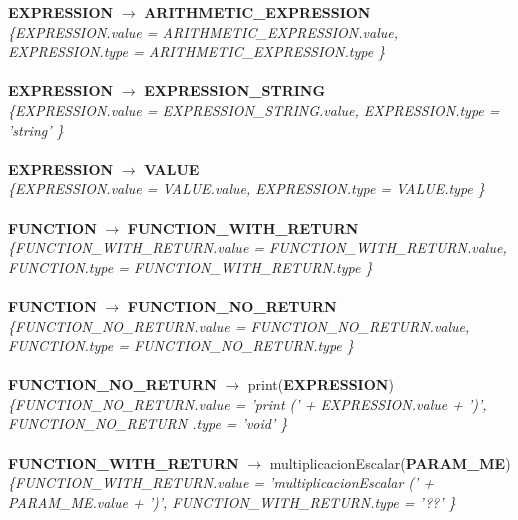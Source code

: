 \documentclass[10pt,a4paper]{article}
\begin{document}
\textbf{EXPRESSION} $\rightarrow$ \textbf{ARITHMETIC\_EXPRESSION} \\   

\textit{\{EXPRESSION.value =  ARITHMETIC\_EXPRESSION.value, EXPRESSION.type = ARITHMETIC\_EXPRESSION.type \}}  \\ \\


\textbf{EXPRESSION} $\rightarrow$ \textbf{EXPRESSION\_STRING} \\

\textit{\{EXPRESSION.value =  EXPRESSION\_STRING.value, EXPRESSION.type = 'string' \}}  \\ \\


\textbf{EXPRESSION} $\rightarrow$ \textbf{VALUE} \\

\textit{\{EXPRESSION.value =  VALUE.value, EXPRESSION.type = VALUE.type \}}  \\ \\



\textbf{FUNCTION} $\rightarrow$ \textbf{FUNCTION\_WITH\_RETURN} \\

\textit{\{FUNCTION\_WITH\_RETURN.value =  FUNCTION\_WITH\_RETURN.value, FUNCTION.type = FUNCTION\_WITH\_RETURN.type \}}  \\ \\


\textbf{FUNCTION} $\rightarrow$ \textbf{FUNCTION\_NO\_RETURN} \\

\textit{\{FUNCTION\_NO\_RETURN.value =  FUNCTION\_NO\_RETURN.value, FUNCTION.type = FUNCTION\_NO\_RETURN.type \}}  \\ \\



\textbf{FUNCTION\_NO\_RETURN} $\rightarrow$ print(\textbf{EXPRESSION}) \\   

\textit{\{FUNCTION\_NO\_RETURN.value =  'print (' + EXPRESSION.value + ')', FUNCTION\_NO\_RETURN .type = 'void' \}}  \\ \\


\textbf{FUNCTION\_WITH\_RETURN} $\rightarrow$ multiplicacionEscalar(\textbf{PARAM\_ME}) \\   

\textit{\{FUNCTION\_WITH\_RETURN.value =  'multiplicacionEscalar (' + PARAM\_ME.value + ')', FUNCTION\_WITH\_RETURN.type = '??' \}}  \\ \\
\end{document}

